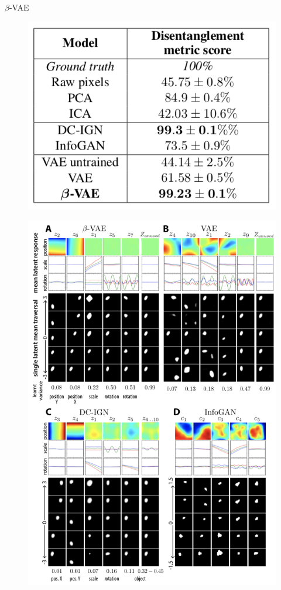 \begin{frame}{$\beta$-VAE}
	\begin{minipage}[t]{0.5\columnwidth}
	    \vspace{1.5cm}
		\begin{figure}
			\centering
			\includegraphics[width=1.\linewidth]{figs/betaVAE_4.png}
		\end{figure}
	\end{minipage}%
	\begin{minipage}[t]{0.5\columnwidth}
		\begin{figure}[h]
			\centering
			\includegraphics[width=.95\linewidth]{figs/betaVAE_5.png}

\end{figure}
\end{minipage}
\end{frame}
